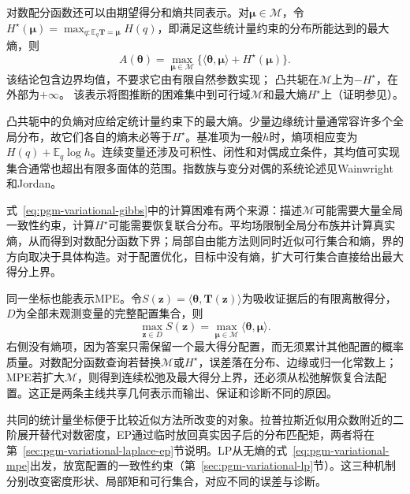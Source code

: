 对数配分函数还可以由期望得分和熵共同表示。对$\bm\mu\in\mathcal M$，令$H^\star(\bm\mu)=\max_{q:\mathbb E_q\bm T=\bm\mu}H(q)$，即满足这些统计量约束的分布所能达到的最大熵，则
\begin{equation}
  A(\bm\theta)=\max_{\bm\mu\in\mathcal M}
    \{\langle\bm\theta,\bm\mu\rangle+H^\star(\bm\mu)\}.
  \label{eq:pgm-variational-gibbs}
\end{equation}
该结论包含边界均值，不要求它由有限自然参数实现；
凸共轭在$\mathcal M$上为$-H^\star$，在外部为$+\infty$。
该表示将图推断的困难集中到可行域$\mathcal M$和最大熵$H^\star$上（证明参见）。

凸共轭中的负熵对应给定统计量约束下的最大熵。少量边缘统计量通常容许多个全局分布，故它们各自的熵未必等于$H^\star$。基准项为一般$h$时，熵项相应变为$H(q)+\mathbb E_q\log h$。连续变量还涉及可积性、闭性和对偶成立条件，其均值可实现集合通常也超出有限多面体的范围。指数族与变分对偶的系统论述见Wainwright和Jordan。

式~\eqref{eq:pgm-variational-gibbs}中的计算困难有两个来源：描述$\mathcal M$可能需要大量全局一致性约束，计算$H^\star$可能需要恢复联合分布。平均场限制全局分布族并计算真实熵，从而得到对数配分函数下界；局部自由能方法则同时近似可行集合和熵，界的方向取决于具体构造。对于配置优化，目标中没有熵，扩大可行集合直接给出最大得分上界。

同一坐标也能表示MPE。令$S(\bm z)=\langle\bm{\theta},\bm T(\bm z)\rangle$为吸收证据后的有限离散得分，$D$为全部未观测变量的完整配置集合，则
\begin{equation}
  \max_{\bm z\in D}S(\bm z)
    =\max_{\bm{\mu}\in\mathcal M}
       \langle\bm{\theta},\bm{\mu}\rangle.
  \label{eq:pgm-variational-mpe}
\end{equation}
右侧没有熵项，因为答案只需保留一个最大得分配置，而无须累计其他配置的概率质量。对数配分函数查询若替换$\mathcal M$或$H^\star$，误差落在分布、边缘或归一化常数上；MPE若扩大$\mathcal M$，则得到连续松弛及最大得分上界，还必须从松弛解恢复合法配置。这正是两条主线共享几何表示而输出、保证和诊断不同的原因。

共同的统计量坐标便于比较近似方法所改变的对象。拉普拉斯近似用众数附近的二阶展开替代对数密度，EP通过临时放回真实因子后的分布匹配矩，两者将在第~\ref{sec:pgm-variational-laplace-ep}节说明。LP从无熵的式~\eqref{eq:pgm-variational-mpe}出发，放宽配置的一致性约束（第~\ref{sec:pgm-variational-lp}节）。这三种机制分别改变密度形状、局部矩和可行集合，对应不同的误差与诊断。

